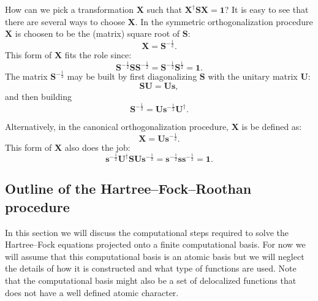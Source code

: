 \documentclass[../Main/chem532-notes.tex]{subfiles}
\begin{document}
How can we pick a transformation $\mathbf{X}$ such that $\mathbf{X}^\dagger \mathbf{SX} = \mathbf{1}$? It is easy to see that there are several ways to choose $\mathbf{X}$.
In the symmetric orthogonalization procedure $\mathbf{X}$ is choosen to be the (matrix) square root of $\mathbf{S}$:
\begin{equation}
\mathbf{X} = \mathbf{S}^{-\frac{1}{2}}.
\end{equation}
This form of $\mathbf{X}$ fits the role since:
\begin{equation}
\mathbf{S}^{-\frac{1}{2}} \mathbf{S} \mathbf{S}^{-\frac{1}{2}} = \mathbf{S}^{-\frac{1}{2}}\mathbf{S}^{\frac{1}{2}}= \mathbf{1}.
\end{equation}
The matrix $\mathbf{S}^{-\frac{1}{2}}$ may be built by first diagonalizing $\mathbf{S}$ with the unitary matrix $\mathbf{U}$:
\begin{equation}
\mathbf{SU} = \mathbf{Us},
\end{equation}
and then building
\begin{equation}
\mathbf{S}^{-\frac{1}{2}} = \mathbf{U} \mathbf{s}^{-\frac{1}{2}}\mathbf{U}^\dagger.
\end{equation}

Alternatively, in the canonical orthogonalization procedure, $\mathbf{X}$ is be defined as:
\begin{equation}
\mathbf{X} = \mathbf{U} \mathbf{s}^{-\frac{1}{2}}.
\end{equation}
This form of $\mathbf{X}$ also does the job: 
\begin{equation}
\mathbf{s}^{-\frac{1}{2}} \mathbf{U}^\dagger \mathbf{S} \mathbf{U} \mathbf{s}^{-\frac{1}{2}} = \mathbf{s}^{-\frac{1}{2}} \mathbf{s} \mathbf{s}^{-\frac{1}{2}} = \mathbf{1}.
\end{equation}

\subsection{Outline of the Hartree--Fock--Roothan procedure}

In this section we will discuss the computational steps required to solve the Hartree--Fock equations projected onto a finite computational basis.
For now we will assume that this computational basis is an atomic basis but we will neglect the details of how it is constructed and what type of functions are used. Note that the computational basis might also be a set of delocalized functions that does not have a well defined atomic character.
\end{document}
